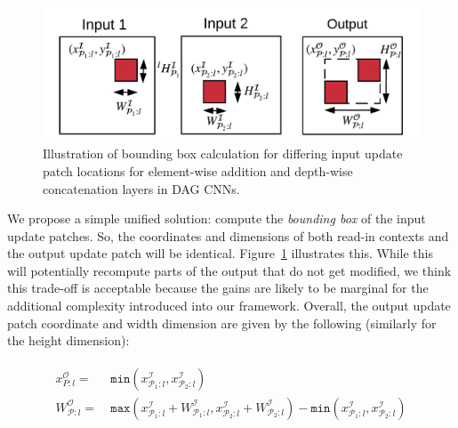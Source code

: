 \begin{figure}[t]
\vspace{-2mm}
\includegraphics[width=\columnwidth]{images/la_operators}
\vspace{-6mm}
\caption{Illustration of bounding box calculation for differing input update patch locations for element-wise addition and depth-wise concatenation layers in DAG CNNs.}
\label{fig:la_operators}
\vspace{-4mm}
\end{figure}

We propose a simple unified solution: compute the \textit{bounding box} of the input update patches. So, the coordinates and dimensions of both read-in contexts and the output update patch will be identical. Figure~\ref{fig:la_operators} illustrates this. While this will potentially recompute parts of the output that do not get modified, we think this trade-off is acceptable because the gains are likely to be marginal for the additional complexity introduced into our framework. Overall, the output update patch coordinate and width dimension are given by the following (similarly for the height dimension):

\vspace{-2mm}
\begin{align}
\begin{split}
x^\mathcal{O}_{P:l} =&~ \texttt{min}(x^\mathcal{I}_{\mathcal{P}_1:l}, x^\mathcal{I}_{\mathcal{P}_2:l})\\
W^\mathcal{O}_{\mathcal{P}:l} =&~ \texttt{max}(x^\mathcal{I}_{\mathcal{P}_1:l}+W^\mathcal{I}_{\mathcal{P}_1:l},x^\mathcal{I}_{\mathcal{P}_2:l}+W^\mathcal{I}_{\mathcal{P}_2:l}) -\texttt{min}(x^\mathcal{I}_{\mathcal{P}_1:l},x^\mathcal{I}_{\mathcal{P}_2:l})
\end{split}
\end{align}

